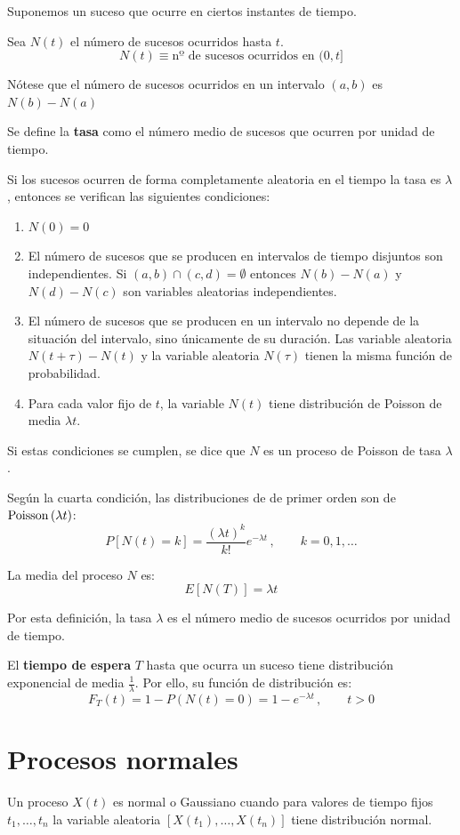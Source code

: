 \documentclass[a4paper]{book}
\begin{document}
Suponemos un suceso que ocurre en ciertos instantes de tiempo.

Sea $N(t)$ el número de sucesos ocurridos hasta $t$.
\[ N(t) \equiv \text{nº de sucesos ocurridos en }(0,t] \]

Nótese que el número de sucesos ocurridos en un intervalo $(a,b)$ es $N(b)-N(a)$

Se define la \textbf{tasa} como el número medio de sucesos que ocurren por unidad de tiempo.

Si los sucesos ocurren de forma completamente aleatoria en el tiempo la tasa es $\lambda$, entonces se verifican las siguientes condiciones:
\begin{enumerate}
	\item $N(0)=0$
	\item El número de sucesos que se producen en intervalos de tiempo disjuntos son independientes. Si $(a,b) \cap (c,d) = \emptyset$ entonces $N(b)-N(a)$ y $N(d)-N(c)$ son variables aleatorias independientes.
	\item El número de sucesos que se producen en un intervalo no depende de la situación del intervalo, sino únicamente de su duración. Las variable aleatoria $N(t+\tau ) - N(t)$ y la variable aleatoria $N(\tau )$ tienen la misma función de probabilidad.
	\item Para cada valor fijo de $t$, la variable $N(t)$ tiene distribución de Poisson de media $\lambda t$.
\end{enumerate}

Si estas condiciones se cumplen, se dice que $N$ es un proceso de Poisson de tasa $\lambda $.

Según la cuarta condición, las distribuciones de de primer orden son de $\operatorname{Poisson} \left( \lambda t \right)$:
\[ P \left[ N(t) = k \right] = \frac{\left( \lambda t \right)^k}{k!}e^{-\lambda t} \, , \qquad k = 0, 1, \dots \]

La media del proceso $N$ es:
\[ E \left[ N(T) \right] = \lambda t\]

Por esta definición, la tasa $\lambda$ es el número medio de sucesos ocurridos por unidad de tiempo.

El \textbf{tiempo de espera} $T$ hasta que ocurra un suceso tiene distribución exponencial de media $\frac{1}{\lambda}$. Por ello, su función de distribución es:
\[ F_T(t) = 1-P \left( N(t) =0 \right) = 1 - e^{-\lambda t} \, , \qquad t>0\]

\section{Procesos normales}
Un proceso $X(t)$ es normal o Gaussiano cuando para valores de tiempo fijos $t_1, \dots , t_n$ la variable aleatoria $\left[ X(t_1), \dots , X(t_n) \right]$ tiene distribución normal.
\end{document}
